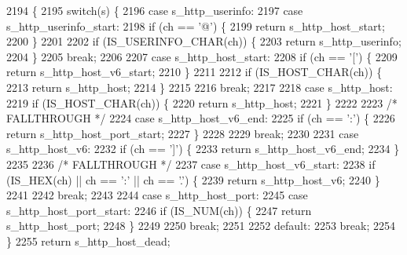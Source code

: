 \begin{DoxyCode}
2194                                                             \{
2195   \textcolor{keywordflow}{switch}(s) \{
2196     \textcolor{keywordflow}{case} s_http_userinfo:
2197     \textcolor{keywordflow}{case} s_http_userinfo_start:
2198       \textcolor{keywordflow}{if} (ch == \textcolor{charliteral}{'@'}) \{
2199         \textcolor{keywordflow}{return} s_http_host_start;
2200       \}
2201 
2202       \textcolor{keywordflow}{if} (IS_USERINFO_CHAR(ch)) \{
2203         \textcolor{keywordflow}{return} s_http_userinfo;
2204       \}
2205       \textcolor{keywordflow}{break};
2206 
2207     \textcolor{keywordflow}{case} s_http_host_start:
2208       \textcolor{keywordflow}{if} (ch == \textcolor{charliteral}{'['}) \{
2209         \textcolor{keywordflow}{return} s_http_host_v6_start;
2210       \}
2211 
2212       \textcolor{keywordflow}{if} (IS_HOST_CHAR(ch)) \{
2213         \textcolor{keywordflow}{return} s_http_host;
2214       \}
2215 
2216       \textcolor{keywordflow}{break};
2217 
2218     \textcolor{keywordflow}{case} s_http_host:
2219       \textcolor{keywordflow}{if} (IS_HOST_CHAR(ch)) \{
2220         \textcolor{keywordflow}{return} s_http_host;
2221       \}
2222 
2223     \textcolor{comment}{/* FALLTHROUGH */}
2224     \textcolor{keywordflow}{case} s_http_host_v6_end:
2225       \textcolor{keywordflow}{if} (ch == \textcolor{charliteral}{':'}) \{
2226         \textcolor{keywordflow}{return} s_http_host_port_start;
2227       \}
2228 
2229       \textcolor{keywordflow}{break};
2230 
2231     \textcolor{keywordflow}{case} s_http_host_v6:
2232       \textcolor{keywordflow}{if} (ch == \textcolor{charliteral}{']'}) \{
2233         \textcolor{keywordflow}{return} s_http_host_v6_end;
2234       \}
2235 
2236     \textcolor{comment}{/* FALLTHROUGH */}
2237     \textcolor{keywordflow}{case} s_http_host_v6_start:
2238       \textcolor{keywordflow}{if} (IS_HEX(ch) || ch == \textcolor{charliteral}{':'} || ch == \textcolor{charliteral}{'.'}) \{
2239         \textcolor{keywordflow}{return} s_http_host_v6;
2240       \}
2241 
2242       \textcolor{keywordflow}{break};
2243 
2244     \textcolor{keywordflow}{case} s_http_host_port:
2245     \textcolor{keywordflow}{case} s_http_host_port_start:
2246       \textcolor{keywordflow}{if} (IS_NUM(ch)) \{
2247         \textcolor{keywordflow}{return} s_http_host_port;
2248       \}
2249 
2250       \textcolor{keywordflow}{break};
2251 
2252     \textcolor{keywordflow}{default}:
2253       \textcolor{keywordflow}{break};
2254   \}
2255   \textcolor{keywordflow}{return} s_http_host_dead;
\end{DoxyCode}
